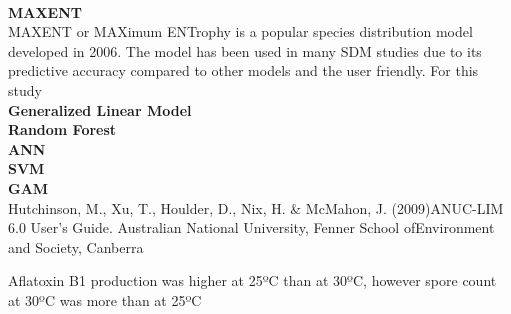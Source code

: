 \\
\textbf{MAXENT}
\\
MAXENT or MAXimum ENTrophy is a popular species distribution model \cite{phillips2006maximum} developed in 2006. The model has been used in many SDM studies due to its predictive accuracy compared to other models and the user friendly. For this study 
\\
\textbf{Generalized Linear Model}
\\
\textbf{Random Forest}
\\
\textbf{ANN}
\\
\textbf{SVM}
\\
\textbf{GAM}
\\

Hutchinson, M., Xu, T., Houlder, D., Nix, H. & McMahon, J. (2009)ANUC-LIM 6.0 User’s Guide. Australian National University, Fenner School ofEnvironment and Society, Canberra

Aflatoxin B1 production was higher at 25ºC than at 30ºC, however spore count at 30ºC was more than at 25ºC
